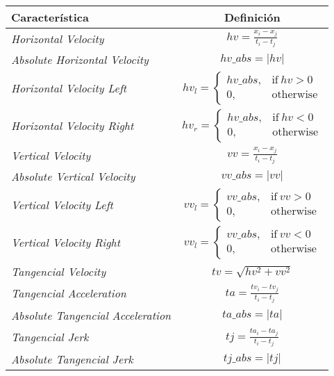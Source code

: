 \begin{xltabular}[c]{\linewidth}{ l c }
    \toprule
    \textbf{Característica} & \textbf{Definición}\\
    \midrule \midrule
    \textit{Horizontal Velocity} &  $ hv =  \frac{x_i - x_j}{t_i - t_j}$ \\ \midrule
    \textit{Absolute Horizontal Velocity} & $ hv\_abs = |hv|$ \\ \midrule
    \textit{Horizontal Velocity Left} &
    $ hv_l =
        \begin{cases}
            hv\_abs, & \text{if}\ hv > 0 \\
            0,       & \text{otherwise}
        \end{cases}
    $ \\ \midrule
    \textit{Horizontal Velocity Right} &
    $ hv_r =
        \begin{cases}
            hv\_abs, & \text{if}\ hv < 0 \\
            0,       & \text{otherwise}
        \end{cases}
    $ \\ \midrule
    \textit{Vertical Velocity} &  $ vv = \frac{x_i - x_j}{t_i - t_j}$\\ \midrule
    \textit{Absolute Vertical Velocity} & $ vv\_abs = |vv|$ \\ \midrule
    \textit{Vertical Velocity Left} &
    $ vv_l =
        \begin{cases}
            vv\_abs, & \text{if}\ vv > 0 \\
            0,       & \text{otherwise}
        \end{cases}
    $ \\ \midrule
    \textit{Vertical Velocity Right} &
    $ vv_l =
        \begin{cases}
            vv\_abs, & \text{if}\ vv < 0 \\
            0,       & \text{otherwise}
        \end{cases}
    $ \\ \midrule
    \textit{Tangencial Velocity} & $ tv = \sqrt{hv^2 + vv^2}$ \\ \midrule
    \textit{Tangencial Acceleration} & $ ta = \frac{tv_i - tv_j}{t_i - t_j} $ \\ \midrule
    \textit{Absolute Tangencial Acceleration} & $ ta\_abs = |ta| $ \\ \midrule
    \textit{Tangencial Jerk} & $ tj = \frac{ta_i - ta_j}{t_i - t_j} $ \\ \midrule
    \textit{Absolute Tangencial Jerk} & $ tj\_abs = |tj| $ \\ \midrule

\end{xltabular}

